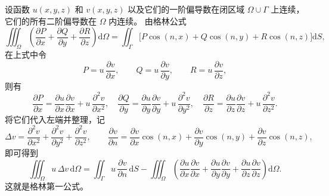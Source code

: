 \begin{definition}[格林第一公式]
设函数 $u(x,y,z)$ 和 $v(x,y,z)$ 以及它们的一阶偏导数在闭区域
$\Omega\cup\Gamma$ 上连续，它们的所有二阶偏导数在 $\Omega$ 内连续。
由格林公式
\[
\iiint_{\Omega}
\left(
  \frac{\partial P}{\partial x}
 +\frac{\partial Q}{\partial y}
 +\frac{\partial R}{\partial z}
\right)\mathrm d\Omega
=
\iint_{\Gamma}
\bigl[P\cos(n,x)+Q\cos(n,y)+R\cos(n,z)\bigr]\mathrm dS,
\]
在上式中令
\[
P = u\,\frac{\partial v}{\partial x},\qquad
Q = u\,\frac{\partial v}{\partial y},\qquad
R = u\,\frac{\partial v}{\partial z},
\]
则有
\[
\frac{\partial P}{\partial x}
= \frac{\partial u}{\partial x}\frac{\partial v}{\partial x}
  + u\,\frac{\partial^2 v}{\partial x^2},\quad
\frac{\partial Q}{\partial y}
= \frac{\partial u}{\partial y}\frac{\partial v}{\partial y}
  + u\,\frac{\partial^2 v}{\partial y^2},\quad
\frac{\partial R}{\partial z}
= \frac{\partial u}{\partial z}\frac{\partial v}{\partial z}
  + u\,\frac{\partial^2 v}{\partial z^2}.
\]
将它们代入左端并整理，记
\[
\Delta v
= \frac{\partial^2 v}{\partial x^2}
 + \frac{\partial^2 v}{\partial y^2}
 + \frac{\partial^2 v}{\partial z^2},\qquad
\frac{\partial v}{\partial n}
= \frac{\partial v}{\partial x}\cos(n,x)
 + \frac{\partial v}{\partial y}\cos(n,y)
 + \frac{\partial v}{\partial z}\cos(n,z),
\]
即可得到
\begin{equation}\label{eq:Green1}
\iiint_{\Omega} u\,\Delta v\,\mathrm d\Omega
=
\iint_{\Gamma} u\,\frac{\partial v}{\partial n}\,\mathrm dS
-
\iiint_{\Omega}
\left(
  \frac{\partial u}{\partial x}\frac{\partial v}{\partial x}
 +\frac{\partial u}{\partial y}\frac{\partial v}{\partial y}
 +\frac{\partial u}{\partial z}\frac{\partial v}{\partial z}
\right)\mathrm d\Omega.
\end{equation}
这就是格林第一公式。
\end{definition}
